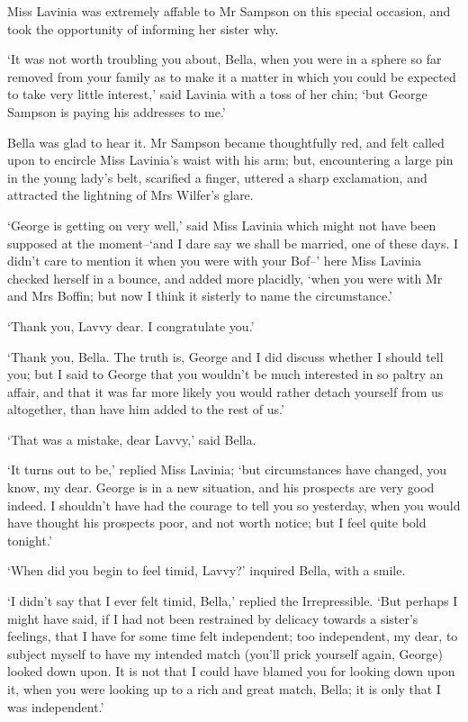 Miss Lavinia was extremely affable to Mr Sampson on this special
occasion, and took the opportunity of informing her sister why.

‘It was not worth troubling you about, Bella, when you were in a sphere
so far removed from your family as to make it a matter in which you
could be expected to take very little interest,’ said Lavinia with a
toss of her chin; ‘but George Sampson is paying his addresses to me.’

Bella was glad to hear it. Mr Sampson became thoughtfully red, and
felt called upon to encircle Miss Lavinia’s waist with his arm; but,
encountering a large pin in the young lady’s belt, scarified a finger,
uttered a sharp exclamation, and attracted the lightning of Mrs Wilfer’s
glare.

‘George is getting on very well,’ said Miss Lavinia which might not have
been supposed at the moment--‘and I dare say we shall be married, one of
these days. I didn’t care to mention it when you were with your Bof--’
here Miss Lavinia checked herself in a bounce, and added more placidly,
‘when you were with Mr and Mrs Boffin; but now I think it sisterly to
name the circumstance.’

‘Thank you, Lavvy dear. I congratulate you.’

‘Thank you, Bella. The truth is, George and I did discuss whether
I should tell you; but I said to George that you wouldn’t be much
interested in so paltry an affair, and that it was far more likely you
would rather detach yourself from us altogether, than have him added to
the rest of us.’

‘That was a mistake, dear Lavvy,’ said Bella.

‘It turns out to be,’ replied Miss Lavinia; ‘but circumstances have
changed, you know, my dear. George is in a new situation, and his
prospects are very good indeed. I shouldn’t have had the courage to tell
you so yesterday, when you would have thought his prospects poor, and
not worth notice; but I feel quite bold tonight.’

‘When did you begin to feel timid, Lavvy?’ inquired Bella, with a smile.

‘I didn’t say that I ever felt timid, Bella,’ replied the Irrepressible.
‘But perhaps I might have said, if I had not been restrained by delicacy
towards a sister’s feelings, that I have for some time felt independent;
too independent, my dear, to subject myself to have my intended match
(you’ll prick yourself again, George) looked down upon. It is not that I
could have blamed you for looking down upon it, when you were looking up
to a rich and great match, Bella; it is only that I was independent.’

